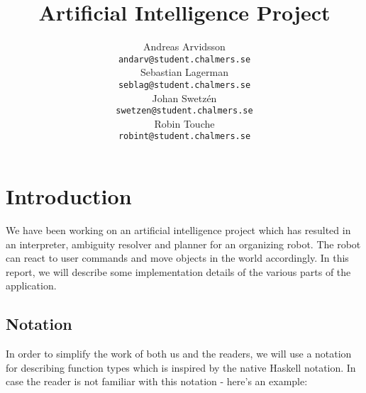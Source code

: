 \documentclass[11pt]{article}
\title{Artificial Intelligence Project}
\author{Andreas Arvidsson \\
  {\tt andarv@student.chalmers.se} \\
  Sebastian Lagerman \\
  {\tt seblag@student.chalmers.se} \\
  Johan Swetz\'{e}n \\
  {\tt swetzen@student.chalmers.se} \\
  Robin Touche \\
  {\tt robint@student.chalmers.se} \\}
\date{}
\begin{document}
\maketitle









\section*{Introduction}
We have been working on an artificial intelligence project which has resulted in an interpreter, ambiguity resolver and planner for an organizing robot.
The robot can react to user commands and move objects in the world accordingly.
In this report, we will describe some implementation details of the various parts of the application.

\subsection*{Notation}
In order to simplify the work of both us and the readers, we will use a notation for describing function types which is inspired by the native Haskell notation.
In case the reader is not familiar with this notation - here's an example:
\end{document}
